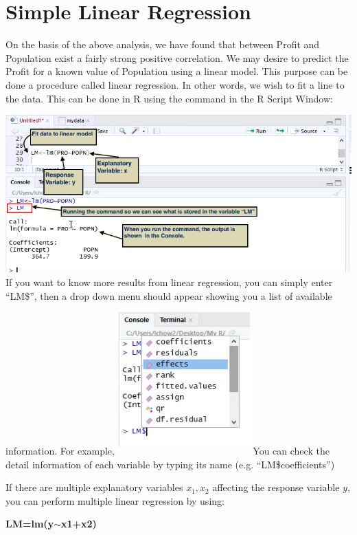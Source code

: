 \documentclass[a4paper]{report}
\begin{document}
    \section{Simple Linear Regression}
        \begin{flushleft}
        On the basis of the above analysis, we have found that between Profit and Population exist a fairly strong positive correlation. We may desire to predict the Profit for a known value of Population using a linear model. This purpose can be done a procedure called linear regression. In other words, we wish to fit a line to the data. This can be done in R using the command in the R Script Window:
        \newline \newline
        
        \includegraphics[width=\textwidth]{images/LM1.png}
        \newline \newline
        If you want to know more results from linear regression, you can simply enter ``LM\$'', then a drop down menu should appear showing you a list of available information. For example, \newline\newline 
        \includegraphics[width=2in,height=2.3in]{images/LM2.png}
        \newline
        You can check the detail information of each variable by typing its name (e.g. ``LM\$coefficients'')
        
        If there are multiple explanatory variables $x_{1}, x_{2}$ affecting the response variable $y$, you can perform multiple linear regression by using:\begin{center}
         \textbf{LM=lm(y$\sim$x1+x2)}
        \end{center}
    
        \end{flushleft}
        
\end{document}
